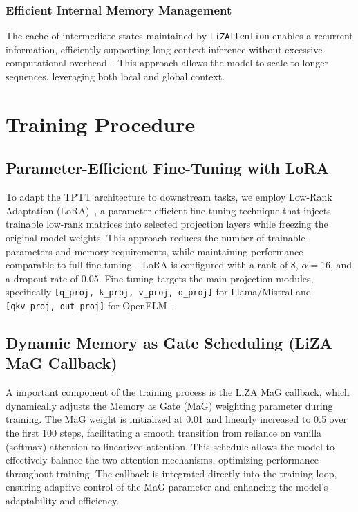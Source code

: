 \documentclass[10pt,a4paper]{article}
\begin{document}
\subsubsection{Efficient Internal Memory Management}

The cache of intermediate states maintained by \texttt{LiZAttention} enables a recurrent information, efficiently supporting long-context inference without excessive computational overhead~\cite{katharopoulos2020transformers}. This approach allows the model to scale to longer sequences, leveraging both local and global context.

\section{Training Procedure}

\subsection{Parameter-Efficient Fine-Tuning with LoRA}

To adapt the TPTT architecture to downstream tasks, we employ Low-Rank Adaptation (LoRA)~\cite{hu2022lora, lora_hf}, a parameter-efficient fine-tuning technique that injects trainable low-rank matrices into selected projection layers while freezing the original model weights. This approach reduces the number of trainable parameters and memory requirements, while maintaining performance comparable to full fine-tuning~\cite{hu2022lora, lora_hf}. LoRA is configured with a rank of 8, $\alpha=16$, and a dropout rate of 0.05. Fine-tuning targets the main projection modules, specifically \texttt{[q\_proj, k\_proj, v\_proj, o\_proj]} for Llama/Mistral and \texttt{[qkv\_proj, out\_proj]} for OpenELM~\cite{lora_hf}.

\subsection{Dynamic Memory as Gate Scheduling (LiZA MaG Callback)}

A important component of the training process is the LiZA MaG callback, which dynamically adjusts the Memory as Gate (MaG) weighting parameter during training. The MaG weight is initialized at 0.01 and linearly increased to 0.5 over the first 100 steps, facilitating a smooth transition from reliance on vanilla (softmax) attention to linearized attention. This schedule allows the model to effectively balance the two attention mechanisms, optimizing performance throughout training. The callback is integrated directly into the training loop, ensuring adaptive control of the MaG parameter and enhancing the model's adaptability and efficiency.
\end{document}
